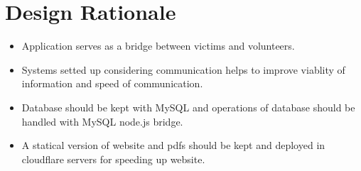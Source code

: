 \section{Design Rationale}

\begin{itemize}
    \item Application serves as a bridge between victims and volunteers.
    \item Systems setted up considering communication helps to improve viablity of information and speed of communication.
    \item Database should be kept with MySQL and operations of database should be handled with MySQL node.js bridge.
    \item A statical version of website and pdfs should be kept and deployed in cloudflare servers for speeding up website.
\end{itemize}